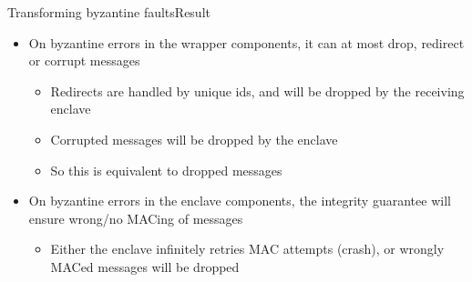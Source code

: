 \documentclass{beamer}
\begin{document}
\begin{frame}{Transforming byzantine faults}{Result}
	\begin{itemize}
		\item On byzantine errors in the wrapper components, it can at most drop, redirect or corrupt messages
		\begin{itemize}
			\item Redirects are handled by unique ids, and will be dropped by the receiving enclave
			\item Corrupted messages will be dropped by the enclave
			\item So this is equivalent to dropped messages
		\end{itemize}

	\vfill

		\item On byzantine errors in the enclave components, the integrity guarantee will ensure wrong/no MACing of messages
		\begin{itemize}
			\item Either the enclave infinitely retries MAC attempts (crash), or wrongly MACed messages will be dropped
		\end{itemize}
	\end{itemize}
\end{frame}
\end{document}
